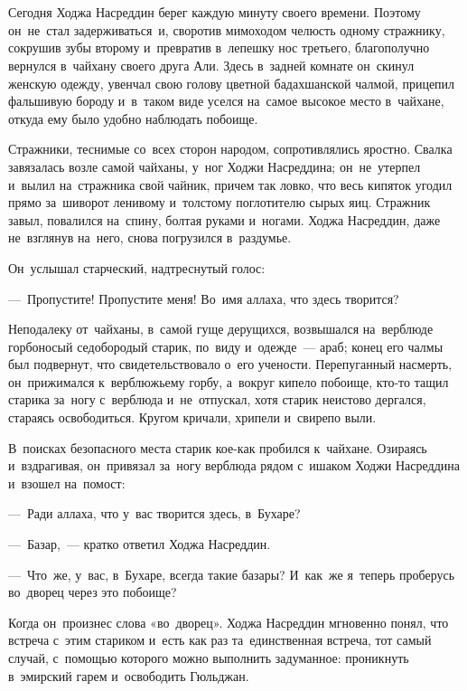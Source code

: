 \documentclass[12pt,a4paper]{book}
\begin{document}
\chapter{}

Сегодня Ходжа Насреддин берег каждую минуту своего времени. Поэтому он~не~стал задерживаться~и, своротив мимоходом челюсть одному стражнику, сокрушив зубы второму и~превратив в~лепешку нос третьего, благополучно вернулся в~чайхану своего друга Али. Здесь в~задней комнате он~скинул женскую одежду, увенчал свою голову цветной бадахшанской чалмой, прицепил фальшивую бороду и~в~таком виде уселся на~самое высокое место в~чайхане, откуда ему было удобно наблюдать побоище.

Стражники, теснимые со~всех сторон народом, сопротивлялись яростно. Свалка завязалась возле самой чайханы, у~ног Ходжи Насреддина; он~не~утерпел и~вылил на~стражника свой чайник, причем так ловко, что весь кипяток угодил прямо за~шиворот ленивому и~толстому поглотителю сырых яиц. Стражник завыл, повалился на~спину, болтая руками и~ногами. Ходжа Насреддин, даже не~взглянув на~него, снова погрузился в~раздумье.

Он~услышал старческий, надтреснутый голос:

—~Пропустите! Пропустите меня! Во~имя аллаха, что здесь творится?

Неподалеку от~чайханы, в~самой гуще дерущихся, возвышался на~верблюде горбоносый седобородый старик, по~виду и~одежде~— араб; конец его чалмы был подвернут, что свидетельствовало о~его учености. Перепуганный насмерть, он~прижимался к~верблюжьему горбу, а~вокруг кипело побоище, кто-то тащил старика за~ногу с~верблюда и~не~отпускал, хотя старик неистово дергался, стараясь освободиться. Кругом кричали, хрипели и~свирепо выли.

В~поисках безопасного места старик кое-как пробился к~чайхане. Озираясь и~вздрагивая, он~привязал за~ногу верблюда рядом с~ишаком Ходжи Насреддина и~взошел на~помост:

—~Ради аллаха, что у~вас творится здесь, в~Бухаре?

—~Базар,~— кратко ответил Ходжа Насреддин.

—~Что~же, у~вас, в~Бухаре, всегда такие базары? И~как~же я~теперь проберусь во~дворец через это побоище?

Когда он~произнес слова «во~дворец». Ходжа Насреддин мгновенно понял, что встреча с~этим стариком и~есть как раз та~единственная встреча, тот самый случай, с~помощью которого можно выполнить задуманное: проникнуть в~эмирский гарем и~освободить Гюльджан.
\end{document}

